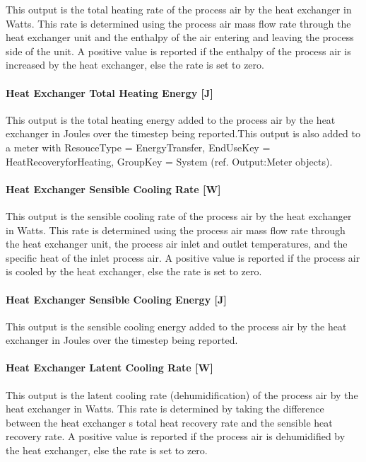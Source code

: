 This output is the total heating rate of the process air by the heat exchanger in Watts. This rate is determined using the process air mass flow rate through the heat exchanger unit and the enthalpy of the air entering and leaving the process side of the unit. A positive value is reported if the enthalpy of the process air is increased by the heat exchanger, else the rate is set to zero.

\paragraph{Heat Exchanger Total Heating Energy {[}J{]}}\label{heat-exchanger-total-heating-energy-j-2}

This output is the total heating energy added to the process air by the heat exchanger in Joules over the timestep being reported.This output is also added to a meter with ResouceType = EnergyTransfer, EndUseKey = HeatRecoveryforHeating, GroupKey = System (ref. Output:Meter objects).

\paragraph{Heat Exchanger Sensible Cooling Rate {[}W{]}}\label{heat-exchanger-sensible-cooling-rate-w-2}

This output is the sensible cooling rate of the process air by the heat exchanger in Watts. This rate is determined using the process air mass flow rate through the heat exchanger unit, the process air inlet and outlet temperatures, and the specific heat of the inlet process air. A positive value is reported if the process air is cooled by the heat exchanger, else the rate is set to zero.

\paragraph{Heat Exchanger Sensible Cooling Energy {[}J{]}}\label{heat-exchanger-sensible-cooling-energy-j-2}

This output is the sensible cooling energy added to the process air by the heat exchanger in Joules over the timestep being reported.

\paragraph{Heat Exchanger Latent Cooling Rate {[}W{]}}\label{heat-exchanger-latent-cooling-rate-w-2}

This output is the latent cooling rate (dehumidification) of the process air by the heat exchanger in Watts. This rate is determined by taking the difference between the heat exchanger s total heat recovery rate and the sensible heat recovery rate. A positive value is reported if the process air is dehumidified by the heat exchanger, else the rate is set to zero.

